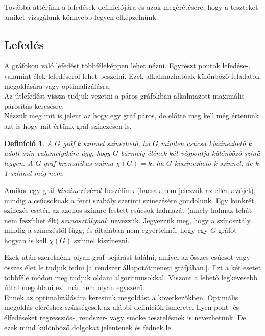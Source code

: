 \documentclass[12pt]{article}
\newtheorem{defin}{Definíció}[section]
\begin{document}
Továbbá áttérünk a lefedések definiciójára és azok megérétésére, hogy a teszteket amiket vizsgálunk könnyebb legyen elképzelnünk.\\

\subsection{Lefedés}

A gráfokon való lefedést többféleképpen lehet nézni. Egyrészt pontok lefedése-, valamint élek lefedéséről lehet beszélni. Ezek alkalmazhatóak különböző feladatok megoldására vagy optimalizálásra.\\
Az útlefedést vissza tudjuk vezetni a páros gráfokban alkalmazott maximális párosítás keresésre.\\

Nézzük meg mit is jelent az hogy egy gráf páros, de előtte meg kell még értenünk azt is hogy mit értünk gráf színezésen is.

\begin{defin}
A $G$ gráf k szinnel szinezhető, ha $G$ minden csúcsa kiszinezhető k adott szin valamelyikére úgy, hogy $G$ bármely élének két végpontja különböző szinü legyen. A $G$ gráf kromatikus száma $\chi(G) = k$, ha $G$ kiszinezhető k szinnel, de k-1 szinnel még nem. ~\cite{szam:Fleiner}
\end{defin}

Amikor egy gráf $kiszinezéséről$ beszélünk (hacsak nem jelezzük az ellenkezőjét), mindig a csúcsoknak a fenti szabály szerinti színezésére gondolunk. Egy konkrét színezés esetén az azonos színűre festett csúcsok halmazát (amely halmaz tehát nem feszíthet élt) $szinosztálynak$ nevezzük. Jegyezzük meg, hogy a színosztály mindig a színezéstől függ, és általában nem egyértelmű, hogy egy $G$ gráfot hogyan is kell $\chi(G)$ színnel kiszínezni.

Ezek után szeretnénk olyan gráf bejárást találni, amivel az összes csúcsot vagy összes élet le tudjuk fedni [a rendszer állapotátmeneti gráfjában.].
Ezt a két esetet többféle módon meg tudjuk oldani algoritmusokkal.
Viszont a lehető legkevesebb úttal megoldani ezt már nem olyan egyszerű.\\
Ennek az optimalizálására keresünk megoldást a következőkben.
Optimális megoldás eléréshez szükségesek az alábbi definiciók ismerete.
Ilyen pont- és élfedéseket regressziós-, rendszer- vagy smoke tesztelésnek is nevezhetünk. De ezek mind különböző dolgokat jelentenek és fednek le.\\
\end{document}
